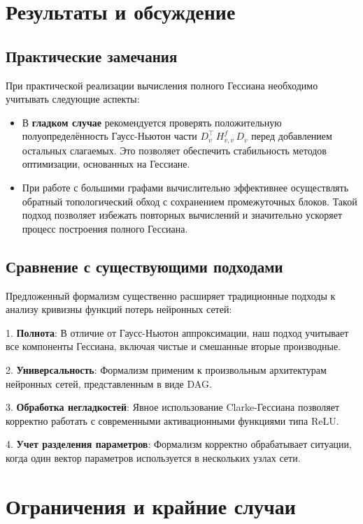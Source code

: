 \documentclass[11pt]{article}
\begin{document}
\section{Результаты и обсуждение}

\subsection{Практические замечания}

При практической реализации вычисления полного Гессиана необходимо учитывать следующие аспекты:

\begin{itemize}
  \item В \textbf{гладком случае} рекомендуется проверять положительную полуопределённость Гаусс-Ньютон части
    $D_v^\top\,H^f_{v,v}\,D_v$ перед добавлением остальных слагаемых. Это позволяет обеспечить стабильность
    методов оптимизации, основанных на Гессиане.

  \item При работе с большими графами вычислительно эффективнее осуществлять обратный топологический обход с
    сохранением промежуточных блоков. Такой подход позволяет избежать повторных вычислений и значительно
    ускоряет процесс построения полного Гессиана.
\end{itemize}

\subsection{Сравнение с существующими подходами}

Предложенный формализм существенно расширяет традиционные подходы к анализу кривизны функций потерь нейронных сетей:

1. \textbf{Полнота}: В отличие от Гаусс-Ньютон аппроксимации, наш подход учитывает все компоненты Гессиана,
включая чистые и смешанные вторые производные.

2. \textbf{Универсальность}: Формализм применим к произвольным архитектурам нейронных сетей, представленным в виде DAG.

3. \textbf{Обработка негладкостей}: Явное использование Clarke-Гессиана позволяет корректно работать с
современными активационными функциями типа ReLU.

4. \textbf{Учет разделения параметров}: Формализм корректно обрабатывает ситуации, когда один вектор
параметров используется в нескольких узлах сети.

\section{Ограничения и крайние случаи}
\end{document}
